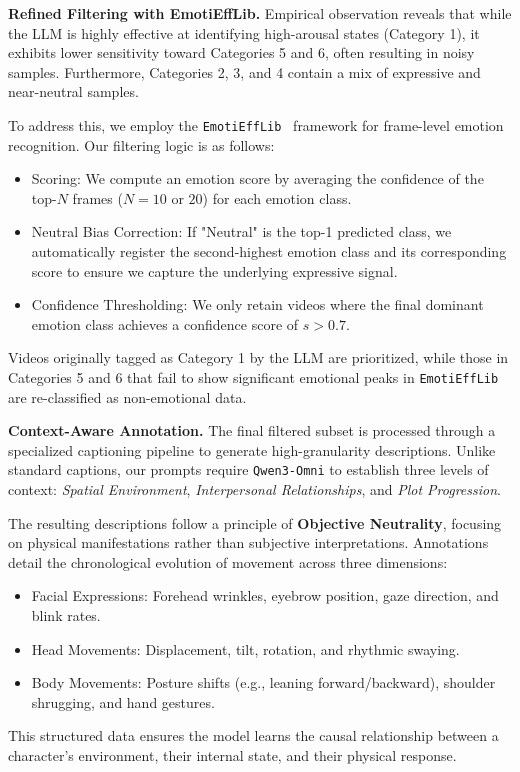 \textbf{Refined Filtering with EmotiEffLib.}  Empirical observation reveals that while the LLM is highly effective at identifying high-arousal states (Category 1), it exhibits lower sensitivity toward Categories 5 and 6, often resulting in noisy samples. Furthermore, Categories 2, 3, and 4 contain a mix of expressive and near-neutral samples.  

To address this, we employ the \texttt{EmotiEffLib}~\cite{savchenko2023facial} framework for frame-level emotion recognition. Our filtering logic is as follows: 
\begin{itemize}     
    \item {Scoring:} We compute an emotion score by averaging the confidence of the top-$N$ frames ($N=10$ or $20$) for each emotion class.     
    \item {Neutral Bias Correction:} If "Neutral" is the top-1 predicted class, we automatically register the second-highest emotion class and its corresponding score to ensure we capture the underlying expressive signal.     
    \item {Confidence Thresholding:} We only retain videos where the final dominant emotion class achieves a confidence score of $s > 0.7$.  
\end{itemize}  

Videos originally tagged as Category 1 by the LLM are prioritized, while those in Categories 5 and 6 that fail to show significant emotional peaks in \texttt{EmotiEffLib} are re-classified as non-emotional data.  

\textbf{Context-Aware Annotation.}  The final filtered subset is processed through a specialized captioning pipeline to generate high-granularity descriptions. Unlike standard captions, our prompts require \texttt{Qwen3-Omni} to establish three levels of context: \textit{Spatial Environment}, \textit{Interpersonal Relationships}, and \textit{Plot Progression}.  

The resulting descriptions follow a principle of \textbf{Objective Neutrality}, focusing on physical manifestations rather than subjective interpretations. Annotations detail the chronological evolution of movement across three dimensions: 
\begin{itemize}     
    \item {Facial Expressions:} Forehead wrinkles, eyebrow position, gaze direction, and blink rates.     
    \item {Head Movements:} Displacement, tilt, rotation, and rhythmic swaying.     
    \item {Body Movements:} Posture shifts (e.g., leaning forward/backward), shoulder shrugging, and hand gestures. 
\end{itemize}  

This structured data ensures the model learns the causal relationship between a character's environment, their internal state, and their physical response.
